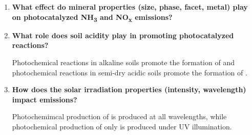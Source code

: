 \begin{enumerate}[label=\textbf{RQ\arabic*.}]
        
      
        
       
        \item \textbf{What effect do mineral properties (size, phase, facet, metal) play on photocatalyzed NH\textsubscript{3} and NO\textsubscript{x} emissions?}
      
        
                \item \textbf{What role does soil acidity play in promoting photocatalyzed reactions?}
                
                  Photochemical reactions in alkaline soils promote the formation of \NO\hspace{0.5mm} and photochemical reactions in semi-dry acidic soils promote the formation of \NH.
        
          
        
                \item \textbf{How does the solar irradiation properties (intensity, wavelength) impact emissions?}
        
        Photochemimcal production of \NO\hspace{0.5mm} is produced at all wavelengths, while photochemical production of \NH\hspace{0.5mm} only is produced under UV illumination.
          
          
        
 
        
\end{enumerate}




